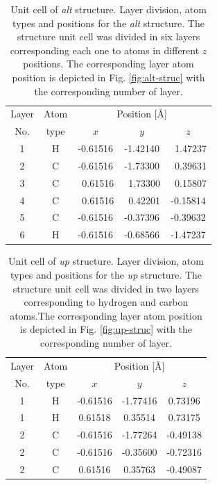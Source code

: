 \documentclass[prb,11pt,tightenlines,twocolumn,aps]{revtex4-1}
\begin{document}
\begin{table}[t]
\center
\begin{tabular}{ccccc}\\
\hline
Layer & Atom & \multicolumn{3}{c}{Position [\AA]} \\
\cline{3-5}
No. & type & $x$ & $y$ & $z$  \\
\hline
1 & H &  -0.61516 &  -1.42140 & \ 1.47237 \\
2 & C &  -0.61516 &  -1.73300 & \ 0.39631 \\
3 & C & \ 0.61516 & \ 1.73300 & \ 0.15807 \\
4 & C & \ 0.61516 & \ 0.42201 &  -0.15814 \\
5 & C &  -0.61516 &  -0.37396 &  -0.39632 \\
6 & H &  -0.61516 &  -0.68566 &  -1.47237 \\
\hline
\end{tabular}
\caption{Unit cell of \emph{alt} structure. Layer division, atom types and
positions for the \emph{alt} structure. The structure unit cell was divided in
six layers corresponding each one to atoms in different $z$ positions. The
corresponding layer atom position is depicted in Fig. \ref{fig:alt-struc} with
the corresponding number of layer.}
\label{tab:alt-unitcell}
\end{table}
% 
\begin{table}[t]
\center
\begin{tabular}{ccccc}\\
\hline
Layer & Atom & \multicolumn{3}{c}{Position [\AA]} \\
\cline{3-5}
No. & type & $x$ & $y$ & $z$  \\
\hline
1 & H & -0.61516 & -1.77416 &  0.73196 \\
1 & H &  0.61518 &  0.35514 &  0.73175 \\
2 & C & -0.61516 & -1.77264 & -0.49138 \\
2 & C & -0.61516 & -0.35600 & -0.72316 \\
2 & C &  0.61516 &  0.35763 & -0.49087 \\
\hline
\end{tabular}
\caption{Unit cell of \emph{up} structure. Layer division, atom types and
positions for the \emph{up} structure. The structure unit cell was divided in
two layers corresponding to hydrogen and carbon atoms.The corresponding layer
atom position is depicted in Fig. \ref{fig:up-struc} with the corresponding
number of layer.}
\label{tab:up-unitcell}
\end{table}
\end{document}
